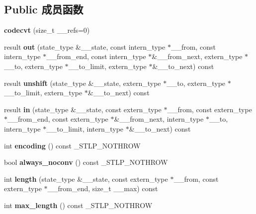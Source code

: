 \subsection*{Public 成员函数}
\begin{DoxyCompactItemize}
\item 
\mbox{\label{classcodecvt_a381b32572ce023f09b8c4db03f8a54cb}} 
{\bfseries codecvt} (size\+\_\+t \+\_\+\+\_\+refs=0)
\item 
\mbox{\label{classcodecvt_a2620d91b586d999e04cbb18d578e1728}} 
result {\bfseries out} (state\+\_\+type \&\+\_\+\+\_\+state, const intern\+\_\+type $\ast$\+\_\+\+\_\+from, const intern\+\_\+type $\ast$\+\_\+\+\_\+from\+\_\+end, const intern\+\_\+type $\ast$\&\+\_\+\+\_\+from\+\_\+next, extern\+\_\+type $\ast$\+\_\+\+\_\+to, extern\+\_\+type $\ast$\+\_\+\+\_\+to\+\_\+limit, extern\+\_\+type $\ast$\&\+\_\+\+\_\+to\+\_\+next) const
\item 
\mbox{\label{classcodecvt_a3f594a167e765dccf56a25af447f12cf}} 
result {\bfseries unshift} (state\+\_\+type \&\+\_\+\+\_\+state, extern\+\_\+type $\ast$\+\_\+\+\_\+to, extern\+\_\+type $\ast$\+\_\+\+\_\+to\+\_\+limit, extern\+\_\+type $\ast$\&\+\_\+\+\_\+to\+\_\+next) const
\item 
\mbox{\label{classcodecvt_af00d6ae60cf75626314f775a3adaf835}} 
result {\bfseries in} (state\+\_\+type \&\+\_\+\+\_\+state, const extern\+\_\+type $\ast$\+\_\+\+\_\+from, const extern\+\_\+type $\ast$\+\_\+\+\_\+from\+\_\+end, const extern\+\_\+type $\ast$\&\+\_\+\+\_\+from\+\_\+next, intern\+\_\+type $\ast$\+\_\+\+\_\+to, intern\+\_\+type $\ast$\+\_\+\+\_\+to\+\_\+limit, intern\+\_\+type $\ast$\&\+\_\+\+\_\+to\+\_\+next) const
\item 
\mbox{\label{classcodecvt_a412c8a526a0d26da8407b0453947573b}} 
int {\bfseries encoding} () const \+\_\+\+S\+T\+L\+P\+\_\+\+N\+O\+T\+H\+R\+OW
\item 
\mbox{\label{classcodecvt_a560a1adb531cf4b5785a3d242424cad7}} 
bool {\bfseries always\+\_\+noconv} () const \+\_\+\+S\+T\+L\+P\+\_\+\+N\+O\+T\+H\+R\+OW
\item 
\mbox{\label{classcodecvt_aca41db0dfa4afbbd1a2b5cecd0659700}} 
int {\bfseries length} (state\+\_\+type \&\+\_\+\+\_\+state, const extern\+\_\+type $\ast$\+\_\+\+\_\+from, const extern\+\_\+type $\ast$\+\_\+\+\_\+from\+\_\+end, size\+\_\+t \+\_\+\+\_\+max) const
\item 
\mbox{\label{classcodecvt_ae401a29ab395cda7b132e4245aa815e7}} 
int {\bfseries max\+\_\+length} () const \+\_\+\+S\+T\+L\+P\+\_\+\+N\+O\+T\+H\+R\+OW
\end{DoxyCompactItemize}
